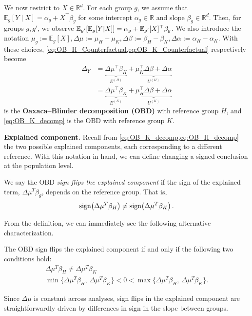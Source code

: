We now restrict to $X \in \mathbb{R}^d$. For each group $g$, we assume that $\mathbb{E}_g[Y \mid X] = \alpha_g + X^\top \beta_g$
for some intercept $\alpha_g \in \mathbb{R}$ and slope $\beta_g \in \mathbb{R}^d$.
Then, for groups $g,g'$, we observe $\mathbb{E}_{g'} [ \mathbb{E}_g  [ Y | X ] ] = \alpha_g + \mathbb{E}_{g'}[X]^\top \beta_g$.
We also introduce the notation
$\mu_g := \mathbb{E}_g[X],
\Delta \mu := \mu_H - \mu_K,
\Delta \beta := \beta_H - \beta_K,
\Delta \alpha := \alpha_H - \alpha_K.
$
With these choices,
\cref{eq:OB_H_Counterfactual,eq:OB_K_Counterfactual} respectively become
\begin{align}   	 
    \label{eq:OB_H_decomp}
	\Delta_Y &= \underbrace{\Delta \mu^\top \beta_H}_{E^{(H)}} + \underbrace{\mu_K^\top \Delta \beta + \Delta \alpha}_{U^{(H)}} \\
    \label{eq:OB_K_decomp}
	&= \underbrace{\Delta \mu^\top \beta_K}_{E^{(K)}} + \underbrace{\mu_H^\top \Delta \beta + \Delta \alpha}_{U^{(K)}}
\end{align}
 is the \textbf{Oaxaca--Blinder decomposition (OBD)} with reference group $H$, and \cref{eq:OB_K_decomp}
is the OBD with reference group $K$.

\textbf{Explained component.}
Recall from \cref{eq:OB_K_decomp,eq:OB_H_decomp} the two possible explained components, each corresponding to a different reference.
With this notation in hand, we can define changing a signed conclusion at the population level.
\begin{definition}
	\label{defn:sign_flip_explained}
	We say the OBD \emph{sign flips the explained component} if the sign of the explained term, $\Delta\mu^T \beta_g$, depends on the reference group. That is,
	\begin{equation}
        \label{eq:sign_flip_condition_explained_neq}
		\operatorname{sign}\!\left(\Delta\mu^T \beta_H\right) \neq \operatorname{sign}\!\left(\Delta\mu^T \beta_K\right).
	\end{equation}
\end{definition}

From the definition, we can immediately see the following alternative characterization.
%
\begin{remark}
    \label{rmk:explained_ordering_sensitivity}
    The OBD sign flips the explained component if and only if the following two conditions hold:
    \begin{gather}
    	\nonumber
    	\Delta\mu^T \beta_H \neq \Delta\mu^T \beta_K \\
    \label{eq:sign_flip_condition_explained}
        \min\{\Delta\mu^T \beta_H,\ \Delta\mu^T \beta_K\}
        < 0 <
        \max\{\Delta\mu^T \beta_H,\ \Delta\mu^T \beta_K\}.
    \end{gather}
\end{remark}
Since $\Delta\mu$ is constant across analyses, sign flips in the explained component are straightforwardly driven
by differences in sign in the slope between groups.

